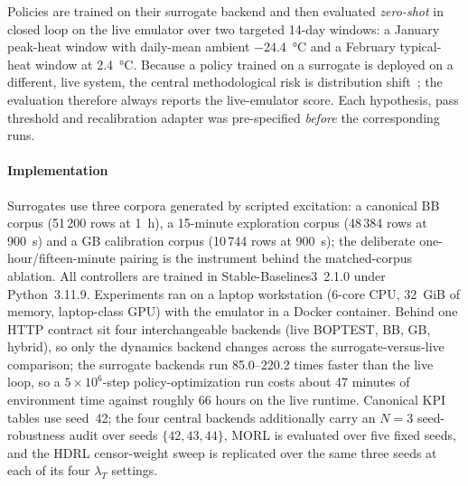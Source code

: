 Policies are trained on their surrogate backend and then evaluated \emph{zero-shot} in closed loop
on the live emulator over two targeted 14-day windows: a January peak-heat window with daily-mean
ambient \SI{-24.4}{\celsius} and a February typical-heat window at \SI{+2.4}{\celsius}. Because a
policy trained on a surrogate is deployed on a different, live system, the central methodological
risk is distribution shift~\cite{Quinonero2009DatasetShift}; the evaluation therefore always reports
the live-emulator score. Each hypothesis, pass threshold and recalibration adapter was pre-specified
\emph{before} the corresponding runs.

\paragraph{Implementation}
Surrogates use three corpora generated by scripted excitation: a canonical BB corpus (51\,200 rows
at \SI{1}{\hour}), a 15-minute exploration corpus (48\,384 rows at \SI{900}{\second}) and a GB
calibration corpus (10\,744 rows at \SI{900}{\second}); the deliberate one-hour/fifteen-minute
pairing is the instrument behind the matched-corpus ablation. All controllers are trained in
Stable-Baselines3~2.1.0 under Python~3.11.9. Experiments ran on a laptop workstation (6-core CPU,
32~GiB of memory, laptop-class GPU) with the emulator in a Docker container. Behind one HTTP contract sit
four interchangeable backends (live BOPTEST, BB, GB, hybrid), so only the dynamics backend changes
across the surrogate-versus-live comparison; the surrogate backends run \numrange{85.0}{220.2} times
faster than the live loop, so a $5\times10^6$-step policy-optimization run costs about 47 minutes of
environment time against roughly 66 hours on the live runtime. Canonical KPI tables use seed~42; the
four central backends additionally carry an $N=3$ seed-robustness audit over seeds
$\{42,43,44\}$, MORL is evaluated over five fixed seeds, and the HDRL censor-weight sweep is replicated over the
same three seeds at each of its four $\lambda_T$ settings.
